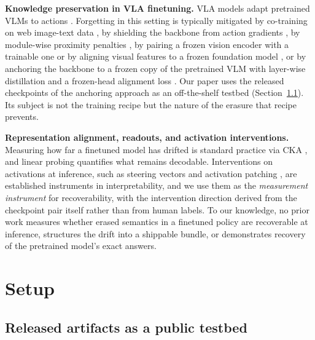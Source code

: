 \documentclass{article}
\begin{document}
\textbf{Knowledge preservation in VLA finetuning.} VLA models adapt pretrained VLMs to
actions \cite{brohan2022rt1,zitkovich2023rt2,driess2023palme,kim2024openvla,
wang2025vlaadapter,starvla2026,black2025pi0}. Forgetting in this setting is typically
mitigated by co-training on web image-text data \cite{zitkovich2023rt2,driess2023palme},
by shielding the backbone from action gradients \cite{driess2025knowledgeinsulation}, by
module-wise proximity penalties \cite{huang2025maps}, by pairing a frozen vision encoder with
a trainable one \cite{grover2025preserving} or by aligning visual features to a frozen
foundation model \cite{kachaev2025donotblind}, or by anchoring the backbone to a frozen
copy of the pretrained VLM with layer-wise distillation and a frozen-head alignment loss
\cite{dalal2026anchoralign}. Our paper uses the released checkpoints of the anchoring approach
\cite{dalal2026anchoralign} as an off-the-shelf testbed (Section~\ref{sec:artifacts}). Its subject is not the
training recipe but the nature of the erasure that recipe prevents.

\textbf{Representation alignment, readouts, and activation interventions.} Measuring how far
a finetuned model has drifted is standard practice via CKA \cite{kornblith2019cka}, and
linear probing quantifies what remains decodable. Interventions on activations at inference,
such as steering vectors and activation patching \cite{turner2023steering,li2023iti}, are
established instruments in interpretability, and we use them as the \emph{measurement instrument} for recoverability, with
the intervention direction derived from the checkpoint pair itself rather than from human
labels. To our knowledge, no prior work measures whether erased semantics in a finetuned
policy are recoverable at inference, structures the drift into a shippable bundle, or
demonstrates recovery of the pretrained model's exact answers.

\section{Setup}
\label{sec:setup}

\subsection{Released artifacts as a public testbed}
\label{sec:artifacts}
\end{document}
